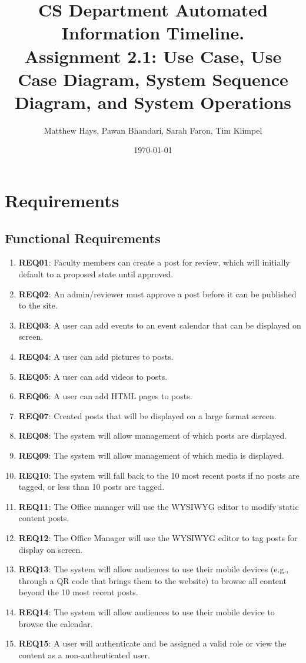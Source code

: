 \documentclass{article}
\title{CS Department Automated Information Timeline. \\ Assignment 2.1: Use Case, Use Case Diagram, System Sequence Diagram, and System Operations}
\date{\today}
\author{Matthew Hays, Pawan Bhandari, Sarah Faron, Tim Klimpel}
\begin{document}
\maketitle
\newpage
\tableofcontents
\listoffigures
\newpage

\section{Requirements}
\subsection{Functional Requirements}
\begin{enumerate}
    \item \textbf{REQ01}: Faculty members can create a post for review, which will initially default to a proposed state until approved.
    \item \textbf{REQ02}: An admin/reviewer must approve a post before it can be published to the site.
    \item \textbf{REQ03}: A user can add events to an event calendar that can be displayed on screen.
    \item \textbf{REQ04}: A user can add pictures to posts.
    \item \textbf{REQ05}: A user can add videos to posts.
    \item \textbf{REQ06}: A user can add HTML pages to posts.
    \item \textbf{REQ07}: Created posts that will be displayed on a large format screen.
    \item \textbf{REQ08}: The system will allow management of which posts are displayed.
    \item \textbf{REQ09}: The system will allow management of which media is displayed.
    \item \textbf{REQ10}: The system will fall back to the 10 most recent posts if no posts are tagged, or less than 10 posts are tagged.
    \item \textbf{REQ11}: The Office manager will use the WYSIWYG editor to modify static content posts. 
    \item \textbf{REQ12}: The Office Manager will use the WYSIWYG editor to tag posts for display on screen.
    \item \textbf{REQ13}: The system will allow audiences to use their mobile devices (e.g., through a QR code that brings them to the website) to browse all content beyond the 10 most recent posts.
    \item \textbf{REQ14}: The system will allow audiences to use their mobile device to browse the calendar.
    \item \textbf{REQ15}: A user will authenticate and be assigned a valid role or view the content as a non-authenticated user.
\end{enumerate}
\end{document}
